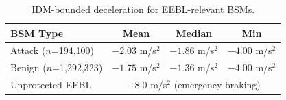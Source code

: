 \begin{table}[t]
\centering
\caption{IDM-bounded deceleration for EEBL-relevant BSMs.}
\label{tab:mitigation}
\small
\begin{tabular}{@{}lccc@{}}
\toprule
\textbf{BSM Type} & \textbf{Mean} & \textbf{Median} & \textbf{Min} \\
\midrule
Attack ($n$=194,100) & $-2.03$ m/s$^2$ & $-1.86$ m/s$^2$ & $-4.00$ m/s$^2$ \\
Benign ($n$=1,292,323) & $-1.75$ m/s$^2$ & $-1.36$ m/s$^2$ & $-4.00$ m/s$^2$ \\
\midrule
Unprotected EEBL & \multicolumn{3}{c}{$-8.0$ m/s$^2$ (emergency braking)} \\
\bottomrule
\end{tabular}
\end{table}